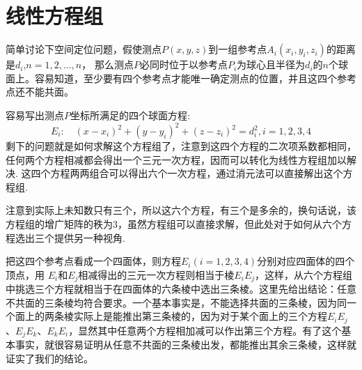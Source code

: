 
\section{线性方程组}
\label{sec:linear-equations-system}

\begin{example}[简单的三维定位]
  简单讨论下空间定位问题，假使测点$P(x,y,z)$到一组参考点$A_i(x_i,y_i,z_i)$的距离是$d_i$,$n=1,2,\ldots,n$， 那么测点$P$必同时位于以参考点$P_i$为球心且半径为$d_i$的$n$个球面上。容易知道，至少要有四个参考点才能唯一确定测点的位置，并且这四个参考点还不能共面。

  容易写出测点$P$坐标所满足的四个球面方程:
  \[ E_i: \quad (x-x_i)^2+(y-y_i)^2+(z-z_i)^2=d_i^2, i = 1,2,3,4 \]
  剩下的问题就是如何求解这个方程组了，注意到这四个方程的二次项系数都相同，任何两个方程相减都会得出一个三元一次方程，因而可以转化为线性方程组加以解决. 这四个方程两两组合可以得出六个一次方程，通过消元法可以直接解出这个方程组.
  
  注意到实际上未知数只有三个，所以这六个方程，有三个是多余的，换句话说，该方程组的增广矩阵的秩为3，虽然方程组可以直接求解，但此处对于如何从六个方程选出三个提供另一种视角.

 把这四个参考点看成一个四面体，则方程$E_i(i=1,2,3,4)$分别对应四面体的四个顶点，用 $E_i$和$E_j$相减得出的三元一次方程则相当于棱$E_iE_j$，这样，从六个方程组中挑选三个方程就相当于在四面体的六条棱中选出三条棱。这里先给出结论：任意不共面的三条棱均符合要求。一个基本事实是，不能选择共面的三条棱，因为同一个面上的两条棱实际上是能推出第三条棱的，因为对于某个面上的三个方程$E_iE_j$、$E_jE_k$、$E_kE_i$，显然其中任意两个方程相加减可以作出第三个方程。有了这个基本事实，就很容易证明从任意不共面的三条棱出发，都能推出其余三条棱，这样就证实了我们的结论。
\end{example}
